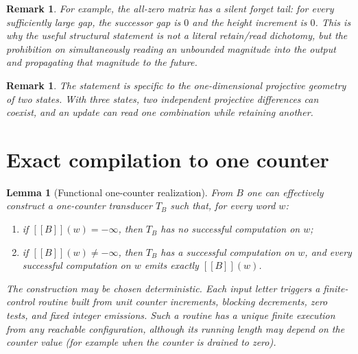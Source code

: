 \documentclass[11pt]{article}
\newtheorem{lemma}[theorem]{Lemma}
\newtheorem{remark}[theorem]{Remark}
\newcommand{\minf}{-\infty}
\newcommand{\eval}[1]{[\![#1]\!]}
\begin{document}
\begin{remark}
For example, the all-zero matrix has a silent forget tail: for every sufficiently large gap, the successor gap is $0$ and the height increment is $0$. This is why the useful structural statement is not a literal retain/read dichotomy, but the prohibition on simultaneously reading an unbounded magnitude into the output and propagating that magnitude to the future.
\end{remark}

\begin{remark}
The statement is specific to the one-dimensional projective geometry of two states. With three states, two independent projective differences can coexist, and an update can read one combination while retaining another.
\end{remark}

\section{Exact compilation to one counter}

\begin{lemma}[Functional one-counter realization]\label{lem:counter}
From $B$ one can effectively construct a one-counter transducer $T_B$ such that, for every word $w$:
\begin{enumerate}[label=(\roman*)]
\item if $\eval{B}(w)=\minf$, then $T_B$ has no successful computation on $w$;
\item if $\eval{B}(w)\neq\minf$, then $T_B$ has a successful computation on $w$, and every successful computation on $w$ emits exactly $\eval{B}(w)$.
\end{enumerate}
The construction may be chosen deterministic. Each input letter triggers a finite-control routine built from unit counter increments, blocking decrements, zero tests, and fixed integer emissions. Such a routine has a unique finite execution from any reachable configuration, although its running length may depend on the counter value (for example when the counter is drained to zero).
\end{lemma}
\end{document}
